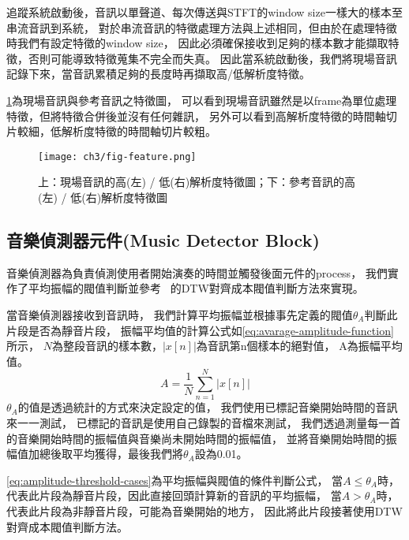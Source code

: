 \documentclass[class=NCU_thesis, crop=false]{standalone}
\begin{document}
追蹤系統啟動後，音訊以單聲道、每次傳送與STFT的window size一樣大的樣本至串流音訊到系統，
對於串流音訊的特徵處理方法與上述相同，但由於在處理特徵時我們有設定特徵的window size，
因此必須確保接收到足夠的樣本數才能擷取特徵，否則可能導致特徵蒐集不完全而失真。
因此當系統啟動後，我們將現場音訊記錄下來，當音訊累積足夠的長度時再擷取高/低解析度特徵。

\cref{fig:fig-ch3-feature}為現場音訊與參考音訊之特徵圖，
可以看到現場音訊雖然是以frame為單位處理特徵，但將特徵合併後並沒有任何雜訊，
另外可以看到高解析度特徵的時間軸切片較細，低解析度特徵的時間軸切片較粗。

\begin{figure}[!hbt]
    \centering
    \texttt{[image: ch3/fig-feature.png]}
    \caption{上：現場音訊的高(左) / 低(右)解析度特徵圖；下：參考音訊的高(左) / 低(右)解析度特徵圖}
    \label{fig:fig-ch3-feature}
\end{figure}

\subsection{音樂偵測器元件(Music Detector Block)} \label{ch3-subst-music-detector}
音樂偵測器為負責偵測使用者開始演奏的時間並觸發後面元件的process，
我們實作了平均振幅的閥值判斷並參考~\cite{Lin2020AHumanComputerDuetSystem}
的DTW對齊成本閥值判斷方法來實現。

當音樂偵測器接收到音訊時，
我們計算平均振幅並根據事先定義的閥值$\theta _{A}$判斷此片段是否為靜音片段，
振幅平均值的計算公式如\cref{eq:avarage-amplitude-function}所示，
$N$為整段音訊的樣本數，$| x[n] \vert$為音訊第n個樣本的絕對值，
A為振幅平均值。
\begin{equation}
    \label{eq:avarage-amplitude-function}
    A = \frac{1}{N} \sum _{n=1}^{N} | x[n] \vert 
\end{equation}
$\theta _{A}$的值是透過統計的方式來決定設定的值，
我們使用已標記音樂開始時間的音訊來一一測試，
已標記的音訊是使用自己錄製的音檔來測試，
我們透過測量每一首的音樂開始時間的振幅值與音樂尚未開始時間的振幅值，
並將音樂開始時間的振幅值加總後取平均獲得，最後我們將$\theta _{A}$設為0.01。

\cref{eq:amplitude-threshold-cases}為平均振幅與閥值的條件判斷公式，
當$A \leq \theta _{A}$時，代表此片段為靜音片段，因此直接回頭計算新的音訊的平均振幅，
當$A > \theta _{A}$時，代表此片段為非靜音片段，可能為音樂開始的地方，
因此將此片段接著使用DTW對齊成本閥值判斷方法。
\end{document}
